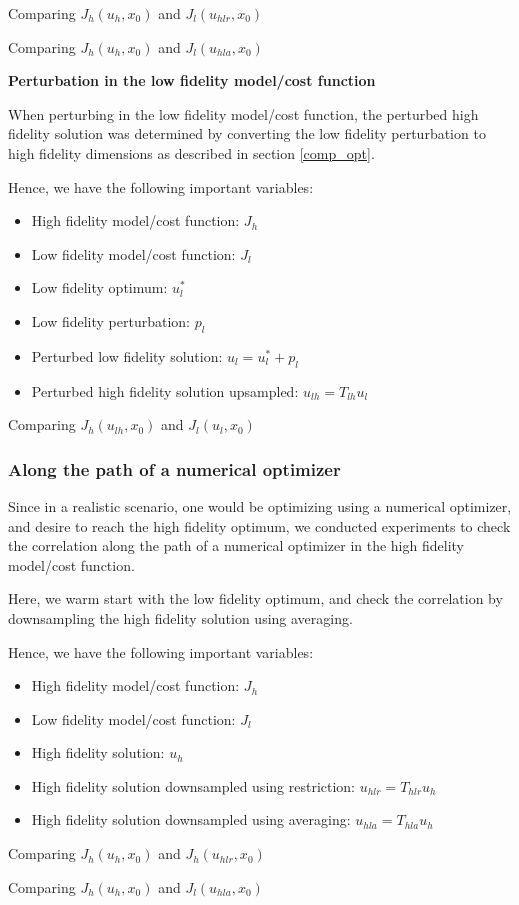\documentclass{article}
\begin{document}
Comparing $J_h(u_h, x_0)$ and $J_l(u_{hlr}, x_0)$

Comparing $J_h(u_h, x_0)$ and $J_l(u_{hla}, x_0)$

\textbf{Perturbation in the low fidelity model/cost function}

When perturbing in the low fidelity model/cost function, the perturbed high fidelity solution was determined
by converting the low fidelity perturbation to high fidelity dimensions as described in section \ref{comp_opt}.

Hence, we have the following important variables:

\begin{itemize}
  \item High fidelity model/cost function: $J_h$
  \item Low fidelity model/cost function: $J_l$
  \item Low fidelity optimum: $u_l^*$
  \item Low fidelity perturbation: $p_l$
  \item Perturbed low fidelity solution: $u_l = u_l^* + p_l$
  \item Perturbed high fidelity solution upsampled: $u_{lh} = T_{lh} u_l$
\end{itemize}

Comparing $J_h(u_{lh}, x_0)$ and $J_l(u_l, x_0)$

\subsubsection{Along the path of a numerical optimizer}

Since in a realistic scenario, one would be optimizing using a numerical optimizer, and desire to reach the high fidelity optimum,
we conducted experiments to check the correlation along the path of a numerical optimizer in the high fidelity model/cost function.

Here, we warm start with the low fidelity optimum, and check the correlation by downsampling the high fidelity solution using averaging.

Hence, we have the following important variables:

\begin{itemize}
  \item High fidelity model/cost function: $J_h$
  \item Low fidelity model/cost function: $J_l$
  \item High fidelity solution: $u_h$
  \item High fidelity solution downsampled using restriction: $u_{hlr} = T_{hlr} u_h$
  \item High fidelity solution downsampled using averaging: $u_{hla} = T_{hla} u_h$
\end{itemize}

Comparing $J_h(u_h, x_0)$ and $J_h(u_{hlr}, x_0)$

Comparing $J_h(u_h, x_0)$ and $J_l(u_{hla}, x_0)$
\end{document}

